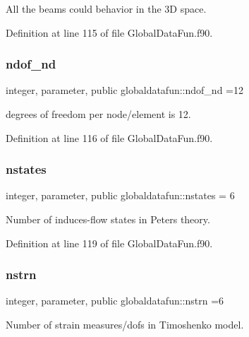 All the beams could behavior in the 3D space. 



Definition at line 115 of file Global\+Data\+Fun.\+f90.

\mbox{\label{namespaceglobaldatafun_a44ab75808fb35a144d54fa9a6c9fe07a}} 
\subsubsection{\texorpdfstring{ndof\+\_\+nd}{ndof\_nd}}
{\footnotesize\ttfamily integer, parameter, public globaldatafun\+::ndof\+\_\+nd =12}



degrees of freedom per node/element is 12. 



Definition at line 116 of file Global\+Data\+Fun.\+f90.

\mbox{\label{namespaceglobaldatafun_a2c33dd8d5d818282893dd132f6b33564}} 
\subsubsection{\texorpdfstring{nstates}{nstates}}
{\footnotesize\ttfamily integer, parameter, public globaldatafun\+::nstates = 6}



Number of induces-\/flow states in Peters theory. 



Definition at line 119 of file Global\+Data\+Fun.\+f90.

\mbox{\label{namespaceglobaldatafun_a3aff613607f0e62fc5c5739e9f2432e9}} 
\subsubsection{\texorpdfstring{nstrn}{nstrn}}
{\footnotesize\ttfamily integer, parameter, public globaldatafun\+::nstrn =6}



Number of strain measures/dofs in Timoshenko model. 



